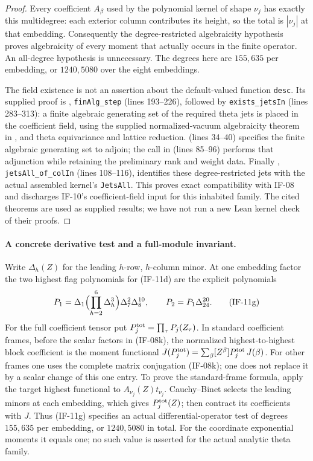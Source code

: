 \documentclass[11pt,a4paper]{article}
\theoremstyle{definition}
\theoremstyle{remark}
\begin{document}
\begin{proof}
Every coefficient $A_\beta$ used by the polynomial kernel of shape
$\nu_j$ has exactly this multidegree: each exterior column contributes
its height, so the total is $|\nu_j|$ at that embedding. Consequently
the degree-restricted algebraicity hypothesis proves algebraicity of
every moment that actually occurs in the finite operator. An
all-degree hypothesis is unnecessary. The degrees here are
$155,635$ per embedding, or $1240,5080$ over the eight embeddings.

The field existence is not an assertion about the default-valued
function \texttt{desc}. Its supplied proof is
,
\texttt{finAlg\_step} (lines 193--226), followed by
\texttt{exists\_jetsIn} (lines 283--313): a finite algebraic generating
set of the required theta jets is placed in the coefficient field,
using the supplied normalized-vacuum algebraicity theorem
in ,
and theta equivariance and lattice reduction.
 (lines 34--40)
specifies the finite algebraic generating set to adjoin; the
 call in 
(lines 85--96) performs that adjunction while retaining the preliminary
rank and weight data.
Finally ,
\texttt{jetsAll\_of\_colIn} (lines 108--116), identifies these
degree-restricted jets with the actual assembled kernel's
\texttt{JetsAll}. This proves exact compatibility with IF-08 and
discharges IF-10's coefficient-field input for this inhabited family.
The cited theorems are used as supplied results; we have not run a
new Lean kernel check of their proofs.
\end{proof}

\paragraph{A concrete derivative test and a full-module invariant.}
Write $\Delta_h(Z)$ for the leading $h$-row, $h$-column minor.
At one embedding factor the two highest flag polynomials for (IF-11d)
are the explicit polynomials
\[
 P_1=\Delta_1\Bigl(\prod_{h=2}^6\Delta_h^3\Bigr)
            \Delta_7^2\Delta_8^{10},\qquad
 P_2=P_1\Delta_{24}^{20}.                         \tag{IF-11g}
\]
For the full coefficient tensor put
$P_j^{\rm tot}=\prod_\tau P_j(Z_\tau)$. In standard coefficient
frames, before the scalar factors in (IF-08k), the normalized
highest-to-highest block coefficient is the moment functional
$J(P_j^{\rm tot})=\sum_\beta[Z^\beta]P_j^{\rm tot}\,J(\beta)$.
For other frames one uses the complete matrix conjugation (IF-08k);
one does not replace it by a scalar change of this one entry.
To prove the standard-frame formula,
apply the target highest functional to $A_{\nu_j}(Z)t_{\nu_j}$.
Cauchy--Binet selects the leading minors at each embedding, which gives
$P_j^{\rm tot}(Z)$; then contract its coefficients with $J$. Thus
(IF-11g) specifies an actual differential-operator test of degrees
$155,635$ per embedding, or $1240,5080$ in total. For the
coordinate exponential moments it equals one; no such value is
asserted for the actual analytic theta family.
\end{document}
